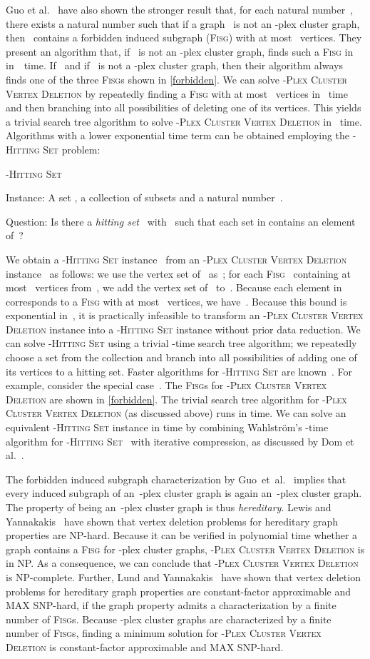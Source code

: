 \documentclass[12pt, a4paper, abstracton]{scrreprt}
\renewcommand{\cite}{~\citep}
\newcommand{\name}{\textsc}
\newcommand{\pvd}[1]{\name{\mbox{-Plex} Cluster Vertex Deletion}}
\newcommand{\hs}[1]{\name{\mbox{-Hitting} Set}}
\newcommand{\pl}[1]{\mbox{-plex}}
\newcommand{\pcg}[1]{\pl #1 cluster graph}
\newcommand{\FISG}{\textsc{Fisg}}
\newcommand{\decprob}[3]{\begin{flushright}
\addtolength{\linewidth}{-1em}
\begin{minipage}{\linewidth}
\textsc{#1}
\begin{compactdesc}
\item[\hspace{\parindent}Instance:] #2
\item[\hspace{\parindent}Question:] #3
\end{compactdesc}  
\end{minipage}
\addtolength{\linewidth}{1em}
\end{flushright}
}
\theoremstyle{definition}
\theoremstyle{remark}
\begin{document}
\noindent
Guo et al.\cite{DBLP:conf/aaim/GuoKNU09} have also shown the stronger result that, for each natural number~, there exists a natural number  such that if a graph~ is not an \pcg s, then~ contains a forbidden induced subgraph (\FISG{}) with at most~ vertices. They present an algorithm that, if~ is not an \pcg s, finds such a \FISG{} in~ in~~time. If~ and if~ is not a \pcg 2, then their algorithm always finds one of the three \FISG{}s shown in \autoref{forbidden}.  We can solve \pvd s by repeatedly finding a \FISG{} with at most ~vertices in ~time and then branching into all possibilities of deleting one of its vertices. This yields a trivial search tree algorithm to solve \pvd s in ~time. Algorithms with a lower exponential time term can be obtained employing the \hs d problem:

\decprob{\hs d}{A set , a collection of subsets  and a natural number~.} {Is there a \emph{hitting set}~ with~ such that each set in  contains an element of~?}

\noindent We obtain a \hs d instance~ from an \pvd s instance~ as follows: we use the vertex set of~ as~; for each \FISG{}~ containing at most~ vertices from~, we add the vertex set of~ to~. Because each element in~ corresponds to a \FISG{} with at most~ vertices, we have~. Because this bound is exponential in~, it is practically infeasible to transform an \pvd s instance into a \hs d instance without prior data reduction. We can solve \hs d using a trivial -time search tree algorithm; we repeatedly choose a set from the collection  and branch into all possibilities of adding one of its vertices to a hitting set. Faster algorithms for \hs d are known\cite{Nie06}. For example, consider the special case~. The \FISG{}s for \pvd 2 are shown in \autoref{forbidden}. The trivial search tree algorithm for \pvd 2 (as discussed above) runs in  time. We can solve an equivalent \hs 4 instance in  time by combining Wahlström's -time algorithm for \hs 3\cite{Wah07} with iterative compression, as discussed by Dom et al.\cite{DGHNT09}.

The forbidden induced subgraph characterization by Guo~et~al.\cite{DBLP:conf/aaim/GuoKNU09} implies that every induced subgraph of an~-plex cluster graph is again an~-plex cluster graph. The property of being an~-plex cluster graph is thus \emph{hereditary}. Lewis and Yannakakis\cite{LY80} have shown that vertex deletion problems for hereditary graph properties are NP-hard. Because it can be verified in polynomial time whether a graph contains a \FISG{} for \pcg ss, \pvd s is in NP.  As a consequence, we can conclude that \pvd s is NP-complete. Further, Lund and Yannakakis\cite{CM93} have shown that vertex deletion problems for hereditary graph properties are constant-factor approximable and MAX SNP-hard, if the graph property admits a characterization by a finite number of \FISG{}s. Because \pcg ss are characterized by a finite number of \FISG{}s, finding a minimum solution for \pvd s is constant-factor approximable and MAX SNP-hard.
\end{document}
